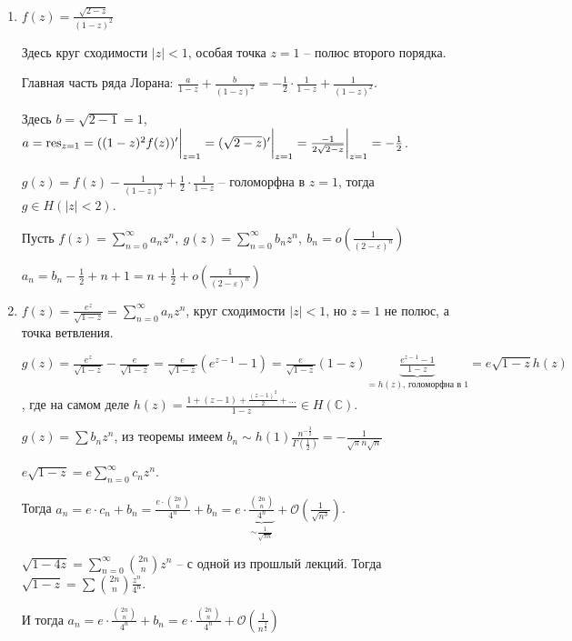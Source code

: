 \begin{example}
    \begin{enumerate}
        \item {
            $f(z) = \frac{\sqrt{2 - z}}{(1 - z)^2}$

            Здесь круг сходимости $|z| < 1$, особая точка $z = 1$ -- полюс второго порядка.

            Главная часть ряда Лорана: $\frac{a}{1 - z} + \frac{b}{(1 - z)^2} = -\frac{1}{2} \cdot \frac{1}{1 - z} + \frac{1}{(1 - z)^2}$.

            Здесь $b = \sqrt{2 - 1} = 1$, $a = \operatorname{res}_{z = 1} = ((1 - z)^2 f(z))' \bigg|_{z = 1} = (\sqrt{2 - z})' \bigg|_{z = 1} = \frac{-1}{2 \sqrt{2 - z}} \bigg|_{z = 1} = -\frac{1}{2}$.

            $g(z) = f(z) - \frac{1}{(1 - z)^2} + \frac{1}{2} \cdot \frac{1}{1 - z}$  -- голоморфна в $z = 1$, тогда $g \in H(|z| < 2)$.

            Пусть $f(z) = \sum_{n=0}^{\infty} a_n z^n, \ g(z) = \sum_{n=0}^{\infty} b_n z^n, \ b_n = o\left( \frac{1}{(2 - \varepsilon)^n} \right)$

            $a_n = b_n -\frac{1}{2} + n + 1 = n + \frac{1}{2} + o \left( \frac{1}{(2 - \varepsilon)^n} \right)$
        }
        \item {
            $f(z) = \frac{e^z}{\sqrt{1 - z}} = \sum_{n = 0}^{\infty} a_n z^n$, круг сходимости $|z| < 1$, но $z = 1$ не полюс, а точка ветвления.

            $g(z) = \frac{e^z}{\sqrt{1 - z}} - \frac{e}{\sqrt{1 - z}} = \frac{e}{\sqrt{1 - z}} (e^{z - 1} - 1) = \frac{e}{\sqrt{1 - z}} (1 - z) \underbrace{\frac{e^{z - 1} - 1}{1 - z}}_{=h(z) \text{, голоморфна в 1}} = e\sqrt{1 - z} h(z)$, где на самом деле $h(z) = \frac{1 + (z - 1) + \frac{(z - 1)^2}{2} + \ldots}{1 - z} \in H(\mathbb{C})$.

            $g(z) = \sum b_n z^n$, из теоремы имеем $b_n \sim h(1) \frac{n^{-\frac{3}{2}}}{\Gamma (\frac{1}{2})} = -\frac{1}{\sqrt{\pi} n \sqrt{n}}$

            $e \sqrt{1 - z} = e \sum_{n=0}^{\infty} c_n z^n$.

            Тогда $a_n = e \cdot c_n + b_n = \frac{e \cdot \binom{2n}{n}}{4^n} + b_n = e \cdot \underbrace{\frac{\binom{2n}{n}}{4^n}}_{\sim \frac{1}{\sqrt{\pi n}}} + \mathcal{O}\left(\frac{1}{\sqrt{n^3}}\right)$.

            $\sqrt{1 - 4z} = \sum_{n=0}^{\infty} \binom{2n}{n} z^n$ -- с одной из прошлый лекций. Тогда $\sqrt{1 - z} = \sum \binom{2n}{n} \frac{z^n}{4^n}$.

            И тогда $a_n = e \cdot \frac{\binom{2n}{n}}{4^n} + b_n = e \cdot \frac{\binom{2n}{n}}{4^n} + \mathcal{O}\left(\frac{1}{n^{\frac{3}{2}}}\right)$
        }
    \end{enumerate}
\end{example}

